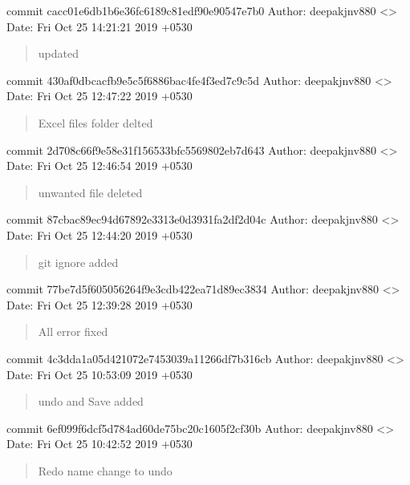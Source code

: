 \documentclass[letterpaper,10pt,english]{sphinxmanual}
\begin{document}
commit cacc01e6db1b6e36fc6189c81edf90e90547e7b0
Author: deepakjnv880 \textless{}\textgreater{}
Date:   Fri Oct 25 14:21:21 2019 +0530
\begin{quote}

updated
\end{quote}

commit 430af0dbcacfb9e5c5f6886bac4fe4f3ed7c9c5d
Author: deepakjnv880 \textless{}\textgreater{}
Date:   Fri Oct 25 12:47:22 2019 +0530
\begin{quote}

Excel files folder delted
\end{quote}

commit 2d708c66f9e58e31f156533bfc5569802eb7d643
Author: deepakjnv880 \textless{}\textgreater{}
Date:   Fri Oct 25 12:46:54 2019 +0530
\begin{quote}

unwanted file deleted
\end{quote}

commit 87cbac89ec94d67892e3313e0d3931fa2df2d04c
Author: deepakjnv880 \textless{}\textgreater{}
Date:   Fri Oct 25 12:44:20 2019 +0530
\begin{quote}

git ignore added
\end{quote}

commit 77be7d5f605056264f9e3cdb422ea71d89ec3834
Author: deepakjnv880 \textless{}\textgreater{}
Date:   Fri Oct 25 12:39:28 2019 +0530
\begin{quote}

All error fixed
\end{quote}

commit 4c3dda1a05d421072e7453039a11266df7b316cb
Author: deepakjnv880 \textless{}\textgreater{}
Date:   Fri Oct 25 10:53:09 2019 +0530
\begin{quote}

undo and Save added
\end{quote}

commit 6ef099f6dcf5d784ad60de75bc20c1605f2cf30b
Author: deepakjnv880 \textless{}\textgreater{}
Date:   Fri Oct 25 10:42:52 2019 +0530
\begin{quote}

Redo name change to undo
\end{quote}
\end{document}
